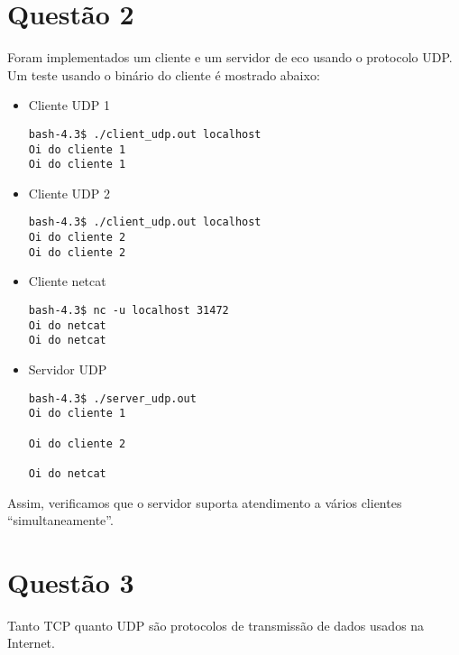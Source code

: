\documentclass[a4paper,10pt]{article}
\begin{document}
\section{Questão 2}

Foram implementados um cliente e um servidor de eco usando o protocolo UDP. Um teste usando o binário do cliente é mostrado abaixo:

\begin{itemize}
\item Cliente UDP 1

\begin{lstlisting}
bash-4.3$ ./client_udp.out localhost
Oi do cliente 1
Oi do cliente 1

\end{lstlisting}

\item Cliente UDP 2

\begin{lstlisting}
bash-4.3$ ./client_udp.out localhost
Oi do cliente 2
Oi do cliente 2

\end{lstlisting}

\item Cliente netcat

\begin{lstlisting}
bash-4.3$ nc -u localhost 31472
Oi do netcat   
Oi do netcat

\end{lstlisting}


\item Servidor UDP

\begin{lstlisting}
bash-4.3$ ./server_udp.out
Oi do cliente 1

Oi do cliente 2

Oi do netcat   

\end{lstlisting}
\end{itemize}

Assim, verificamos que o servidor suporta atendimento a vários clientes ``simultaneamente''.

\section{Questão 3}

Tanto TCP quanto UDP são protocolos de transmissão de dados usados na Internet. 
\end{document}
